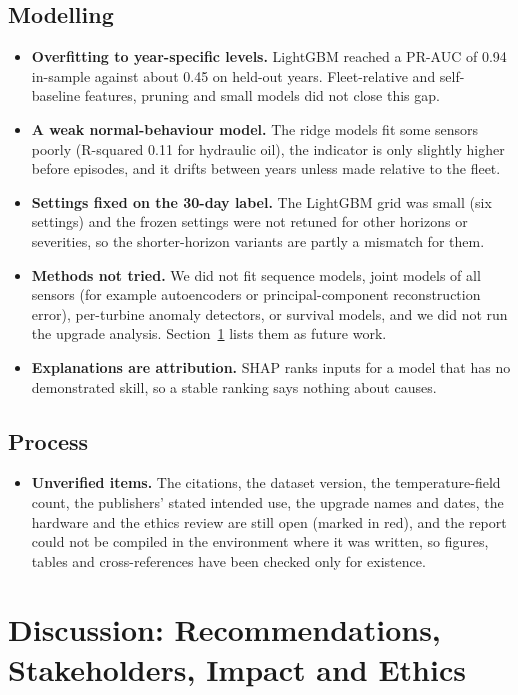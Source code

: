 \documentclass[12pt,a4paper]{article}
\begin{document}
	\subsection{Modelling}
	\begin{itemize}
		\item \textbf{Overfitting to year-specific levels.} LightGBM reached a PR-AUC of 0.94 in-sample against about 0.45 on held-out years. Fleet-relative and self-baseline features, pruning and small models did not close this gap.
		\item \textbf{A weak normal-behaviour model.} The ridge models fit some sensors poorly (R-squared 0.11 for hydraulic oil), the indicator is only slightly higher before episodes, and it drifts between years unless made relative to the fleet.
		\item \textbf{Settings fixed on the 30-day label.} The LightGBM grid was small (six settings) and the frozen settings were not retuned for other horizons or severities, so the shorter-horizon variants are partly a mismatch for them.
		\item \textbf{Methods not tried.} We did not fit sequence models, joint models of all sensors (for example autoencoders or principal-component reconstruction error), per-turbine anomaly detectors, or survival models, and we did not run the upgrade analysis. Section~\ref{sec:disc} lists them as future work.
		\item \textbf{Explanations are attribution.} SHAP ranks inputs for a model that has no demonstrated skill, so a stable ranking says nothing about causes.
	\end{itemize}

	\subsection{Process}
	\begin{itemize}
		\item \textbf{Unverified items.} The citations, the dataset version, the temperature-field count, the publishers' stated intended use, the upgrade names and dates, the hardware and the ethics review are still open (marked in red), and the report could not be compiled in the environment where it was written, so figures, tables and cross-references have been checked only for existence.
	\end{itemize}

	\section{Discussion: Recommendations, Stakeholders, Impact and Ethics}\label{sec:disc}
\end{document}
